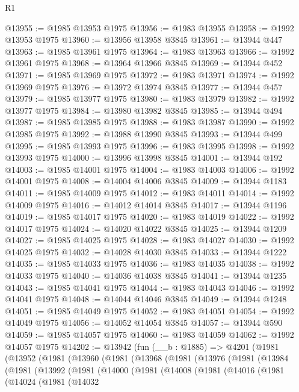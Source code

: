 \begin{lexlean}{R1}
\begin{coremodule}
@13955 := @1985 @13953 @1975
@13956 := @1983 @13955
@13958 := @1992 @13953 @1975
@13960 := @13956 @13958 @3845
@13961 := @13944 @447
@13963 := @1985 @13961 @1975
@13964 := @1983 @13963
@13966 := @1992 @13961 @1975
@13968 := @13964 @13966 @3845
@13969 := @13944 @452
@13971 := @1985 @13969 @1975
@13972 := @1983 @13971
@13974 := @1992 @13969 @1975
@13976 := @13972 @13974 @3845
@13977 := @13944 @457
@13979 := @1985 @13977 @1975
@13980 := @1983 @13979
@13982 := @1992 @13977 @1975
@13984 := @13980 @13982 @3845
@13985 := @13944 @494
@13987 := @1985 @13985 @1975
@13988 := @1983 @13987
@13990 := @1992 @13985 @1975
@13992 := @13988 @13990 @3845
@13993 := @13944 @499
@13995 := @1985 @13993 @1975
@13996 := @1983 @13995
@13998 := @1992 @13993 @1975
@14000 := @13996 @13998 @3845
@14001 := @13944 @192
@14003 := @1985 @14001 @1975
@14004 := @1983 @14003
@14006 := @1992 @14001 @1975
@14008 := @14004 @14006 @3845
@14009 := @13944 @1183
@14011 := @1985 @14009 @1975
@14012 := @1983 @14011
@14014 := @1992 @14009 @1975
@14016 := @14012 @14014 @3845
@14017 := @13944 @1196
@14019 := @1985 @14017 @1975
@14020 := @1983 @14019
@14022 := @1992 @14017 @1975
@14024 := @14020 @14022 @3845
@14025 := @13944 @1209
@14027 := @1985 @14025 @1975
@14028 := @1983 @14027
@14030 := @1992 @14025 @1975
@14032 := @14028 @14030 @3845
@14033 := @13944 @1222
@14035 := @1985 @14033 @1975
@14036 := @1983 @14035
@14038 := @1992 @14033 @1975
@14040 := @14036 @14038 @3845
@14041 := @13944 @1235
@14043 := @1985 @14041 @1975
@14044 := @1983 @14043
@14046 := @1992 @14041 @1975
@14048 := @14044 @14046 @3845
@14049 := @13944 @1248
@14051 := @1985 @14049 @1975
@14052 := @1983 @14051
@14054 := @1992 @14049 @1975
@14056 := @14052 @14054 @3845
@14057 := @13944 @590
@14059 := @1985 @14057 @1975
@14060 := @1983 @14059
@14062 := @1992 @14057 @1975
@14202 := @13942
    (fun (__b : @1885) =>
    @4201
      (@1981
        (@13952
          (@1981
            (@13960
              (@1981
                (@13968
                  (@1981
                    (@13976
                      (@1981
                        (@13984
                          (@1981
                            (@13992
                              (@1981
                                (@14000
                                  (@1981
                                    (@14008
                                      (@1981
                                        (@14016
                                          (@1981
                                            (@14024
                                              (@1981
                                                (@14032

\end{coremodule}
\end{lexlean}
